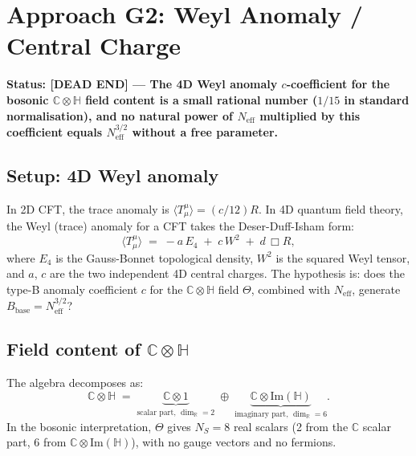 \documentclass[11pt,a4paper]{article}
\theoremstyle{definition}
\theoremstyle{remark}
\begin{document}
\section{Approach G2: Weyl Anomaly / Central Charge}
\label{sec:G2}

\textbf{Status: [DEAD END] — The 4D Weyl anomaly $c$-coefficient for the
bosonic $\mathbb{C}\otimes\mathbb{H}$ field content is a small rational
number ($1/15$ in standard normalisation), and no natural power of
$N_{\mathrm{eff}}$ multiplied by this coefficient equals
$N_{\mathrm{eff}}^{3/2}$ without a free parameter.}

\subsection{Setup: 4D Weyl anomaly}

In 2D CFT, the trace anomaly is $\langle T^\mu_\mu\rangle = (c/12)R$.
In 4D quantum field theory, the Weyl (trace) anomaly for a CFT takes the
Deser-Duff-Isham form:
\begin{equation}
  \langle T^\mu_\mu\rangle
  \;=\; -a\,E_4 \;+\; c\,W^2 \;+\; d\,\Box R,
  \label{eq:weyl_4D}
\end{equation}
where $E_4$ is the Gauss-Bonnet topological density, $W^2$ is the squared
Weyl tensor, and $a$, $c$ are the two independent 4D central charges.
The hypothesis is: does the type-B anomaly coefficient $c$ for the
$\mathbb{C}\otimes\mathbb{H}$ field $\Theta$, combined with $N_{\mathrm{eff}}$,
generate $B_{\mathrm{base}} = N_{\mathrm{eff}}^{3/2}$?

\subsection{Field content of $\mathbb{C}\otimes\mathbb{H}$}

The algebra decomposes as:
\begin{equation}
  \mathbb{C}\otimes\mathbb{H}
  \;=\; \underbrace{\mathbb{C}\otimes 1}_{\text{scalar part, }\dim_\mathbb{R} = 2}
  \;\oplus\;
  \underbrace{\mathbb{C}\otimes\mathrm{Im}(\mathbb{H})}_{\text{imaginary part, }\dim_\mathbb{R} = 6}.
  \label{eq:CotimesH_decomp}
\end{equation}
In the bosonic interpretation, $\Theta$ gives $N_S = 8$ real scalars
(2 from the $\mathbb{C}$ scalar part, 6 from $\mathbb{C}\otimes\mathrm{Im}(\mathbb{H})$),
with no gauge vectors and no fermions.
\end{document}
